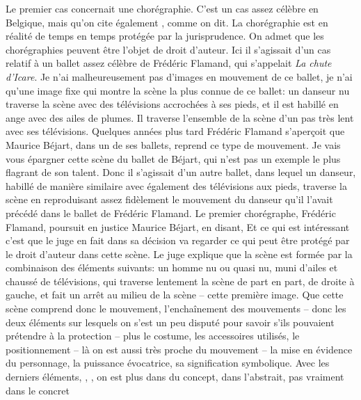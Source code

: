 {Le premier cas concernait une chor\'egraphie. C'est un cas assez
c\'el\`ebre en Belgique, mais qu'on cite \'egalement
, comme on dit. La chor\'egraphie est en
r\'ealit\'e de temps en temps prot\'eg\'ee par la jurisprudence. On
admet que les chor\'egraphies peuvent \^etre l'objet de droit d'auteur.
Ici il s'agissait d'un cas relatif \`a un ballet assez c\'el\`ebre de
Fr\'ed\'eric Flamand, qui s'appelait {\em La chute d'Icare}. Je n'ai
malheureusement pas d'images en mouvement de ce ballet, je n'ai qu'une
image fixe qui montre la sc\`ene la plus connue de ce ballet: un
danseur nu traverse la sc\`ene avec des t\'el\'evisions accroch\'ees
\`a ses pieds, et il est habill\'e en ange avec des ailes de plumes. Il
traverse l'ensemble de la sc\`ene d'un pas tr\`es lent avec ses
t\'el\'evisions. Quelques ann\'ees plus tard Fr\'ed\'eric Flamand
s'aper\c{c}oit que Maurice B\'ejart, dans un de ses ballets, reprend ce
type de mouvement. Je vais vous \'epargner cette sc\`ene du ballet de
B\'ejart, qui n'est pas un exemple le plus flagrant de son talent. Donc
il s'agissait d'un autre ballet, dans lequel un danseur, habill\'e de
mani\`ere similaire avec \'egalement des t\'el\'evisions aux pieds,
traverse la sc\`ene en reproduisant assez fid\`element le mouvement du
danseur qu'il l'avait pr\'ec\'ed\'e dans le ballet de Fr\'ed\'eric
Flamand. Le premier chor\'egraphe, Fr\'ed\'eric Flamand, poursuit en
justice Maurice B\'ejart, en disant,  Et ce qui est int\'eressant c'est que le juge en fait dans
sa d\'ecision va regarder ce qui peut \^etre prot\'eg\'e par le droit
d'auteur dans cette sc\`ene. Le juge explique que la sc\`ene est
form\'ee par la combinaison des \'el\'ements suivants: un homme nu ou
quasi nu, muni d'ailes et chauss\'e de
t\'el\'evisions, qui traverse lentement la sc\`ene de part en part, de
droite \`a gauche, et fait un arr\^et au milieu de la sc\`ene {--}
cette premi\`ere image. Que cette sc\`ene comprend donc le mouvement,
l'encha\^inement des mouvements {--} donc les deux \'el\'ements sur
lesquels on s'est un peu disput\'e pour savoir s'ils pouvaient
pr\'etendre \`a la protection {--} plus le costume, les accessoires
utilis\'es, le positionnement {--} l\`a on est aussi tr\`es proche du
mouvement {--} la mise en \'evidence du personnage, la puissance
\'evocatrice, sa signification symbolique. Avec les derniers
\'el\'ements, , , on
est plus dans du concept, dans l'abstrait, pas vraiment dans le concret
}

